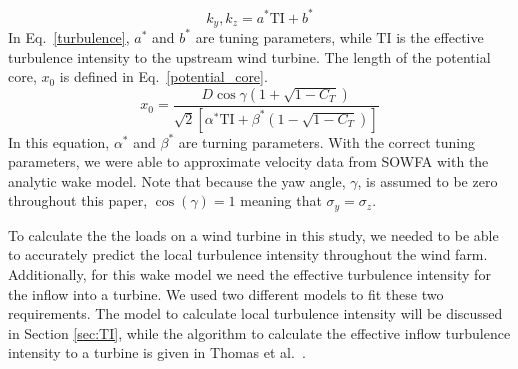 \documentclass[11pt,letterpaper]{article}
\begin{document}
%
\begin{equation}
    \label{turbulence}
    k_y,k_z = a^*\text{TI}+b^*
\end{equation}
%
In Eq.~\ref{turbulence}, $a^*$ and $b^*$ are tuning parameters, while $\text{TI}$ is the effective turbulence intensity to the upstream wind turbine. 
The length of the potential core, $x_0$ is defined in Eq.~\ref{potential_core}.
%
\begin{equation}
    \label{potential_core}
    x_0 = \frac{D \cos{\gamma} (1 + \sqrt{1-C_T})}{\sqrt{2}[\alpha^*\text{TI} + \beta^* (1-\sqrt{1-C_T})]}
\end{equation}
% 
In this equation, $\alpha^*$ and $\beta^*$ are turning parameters.
With the correct tuning parameters, we were able to approximate velocity data from SOWFA with the analytic wake model. 
% 
Note that because the yaw angle, $\gamma$, is assumed to be zero throughout this paper, $\cos(\gamma)=1$ meaning that $\sigma_y=\sigma_z$. 

To calculate the the loads on a wind turbine in this study, we needed to be able to accurately predict the local turbulence intensity throughout the wind farm. Additionally, for this wake model we need the effective turbulence intensity for the inflow into a turbine. We used two different models to fit these two requirements. The model to calculate local turbulence intensity will be discussed in Section \ref{sec:TI}, while the algorithm to calculate the effective inflow turbulence intensity to a turbine is given in Thomas et al.~\cite{Thomas2019}.
\end{document}
